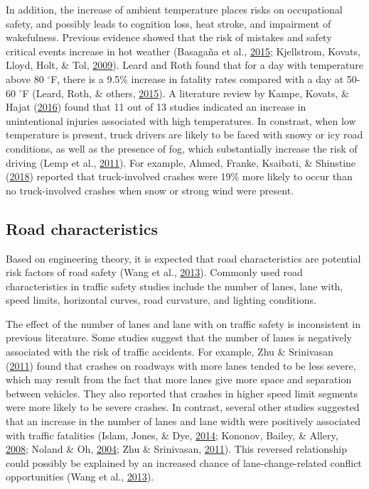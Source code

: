 \documentclass[12pt]{book}
\numberwithin{equation}{chapter}
\begin{document}
In addition, the increase of ambient temperature places risks on occupational safety, and possibly leads to cognition loss, heat stroke, and impairment of wakefulness. Previous evidence showed that the risk of mistakes and safety critical events increase in hot weather (Basagaña et al., \protect\hyperlink{ref-basagana2015high}{2015}; Kjellstrom, Kovats, Lloyd, Holt, \& Tol, \protect\hyperlink{ref-kjellstrom2009direct}{2009}). Leard and Roth found that for a day with temperature above 80 \(^{\circ}\)F, there is a 9.5\% increase in fatality rates compared with a day at 50-60 \(^{\circ}\)F (Leard, Roth, \& others, \protect\hyperlink{ref-leard2015weather}{2015}). A literature review by Kampe, Kovats, \& Hajat (\protect\hyperlink{ref-im2016impact}{2016}) found that 11 out of 13 studies indicated an increase in unintentional injuries associated with high temperatures. In constrast, when low temperature is present, truck drivers are likely to be faced with snowy or icy road conditions, as well as the presence of fog, which substantially increase the risk of driving (Lemp et al., \protect\hyperlink{ref-lemp2011analysis}{2011}). For example, Ahmed, Franke, Ksaibati, \& Shinstine (\protect\hyperlink{ref-ahmed2018effects}{2018}) reported that truck-involved crashes were 19\% more likely to occur than no truck-involved crashes when snow or strong wind were present.

\hypertarget{road-characteristics}{%
\subsection{Road characteristics}\label{road-characteristics}}

Based on engineering theory, it is expected that road characteristics are potential risk factors of road safety (Wang et al., \protect\hyperlink{ref-wang2013effect}{2013}). Commonly used road characteristics in traffic safety studies include the number of lanes, lane with, speed limits, horizontal curves, road curvature, and lighting conditions.

The effect of the number of lanes and lane with on traffic safety is inconsistent in previous literature. Some studies suggest that the number of lanes is negatively associated with the risk of traffic accidents. For example, Zhu \& Srinivasan (\protect\hyperlink{ref-zhu2011comprehensive}{2011}) found that crashes on roadways with more lanes tended to be less severe, which may result from the fact that more lanes give more space and separation between vehicles. They also reported that crashes in higher speed limit segments were more likely to be severe crashes. In contrast, several other studies suggested that an increase in the number of lanes and lane width were positively associated with traffic fatalities (Islam, Jones, \& Dye, \protect\hyperlink{ref-islam2014comprehensive}{2014}; Kononov, Bailey, \& Allery, \protect\hyperlink{ref-kononov2008relationships}{2008}; Noland \& Oh, \protect\hyperlink{ref-noland2004effect}{2004}; Zhu \& Srinivasan, \protect\hyperlink{ref-zhu2011comprehensive}{2011}). This reversed relationship could possibly be explained by an increased chance of lane-change-related conflict opportunities (Wang et al., \protect\hyperlink{ref-wang2013effect}{2013}).
\end{document}
